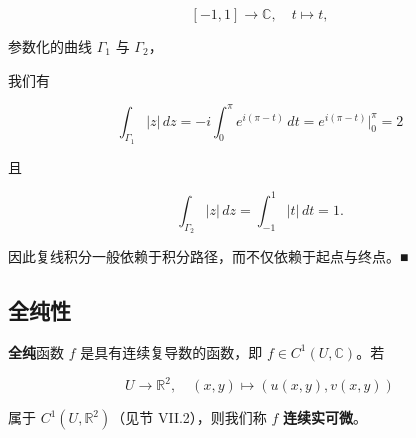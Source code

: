 \begin{example}
\begin{items}
\[
[-1,1] \to \mathbb{C} , \quad t \mapsto t ,
\]

参数化的曲线 $ \Gamma_{1} $ 与 $ \Gamma_{2} $，

\end{items}


我们有

\[
\int_{\Gamma_{1}}|z|\,dz = -i\int_{0}^{\pi}e^{i(\pi - t)}\,dt = e^{i(\pi - t)}\big|_{0}^{\pi} = 2
\]

且

\[
\int_{\Gamma_{2}}|z|\,dz = \int_{-1}^{1}|t|\,dt = 1 .
\]

因此复线积分一般依赖于积分路径，而不仅依赖于起点与终点。\nobreak\hspace{0.35em}■

\end{example}

\subsection*{全纯性}

\textbf{全纯}函数 $ f $ 是具有连续复导数的函数，即 $ f \in C^{1}(U,\mathbb{C}) $。若

\[
U \to \mathbb{R}^{2} , \quad (x,y) \mapsto (u(x,y),v(x,y))
\]

属于 $ C^{1}(U,\mathbb{R}^{2}) $（见节 VII.2），则我们称 $ f $ \textbf{连续实可微}。

